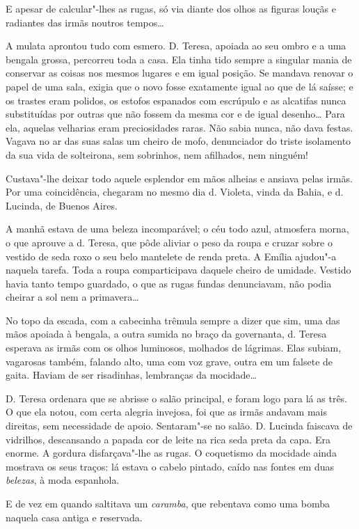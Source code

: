 E apesar de calcular"-lhes as rugas, só via diante dos olhos as figuras
louçãs e radiantes das irmãs noutros tempos\ldots{}

A mulata aprontou tudo com esmero. D. Teresa, apoiada ao seu ombro e a
uma bengala grossa, percorreu toda a casa. Ela tinha tido sempre a
singular mania de conservar as coisas nos mesmos lugares e em igual
posição. Se mandava renovar o papel de uma sala, exigia que o novo fosse
exatamente igual ao que de lá saísse; e os trastes eram polidos, os
estofos espanados com escrúpulo e as alcatifas nunca substituídas por
outras que não fossem da mesma cor e de igual desenho\ldots{} Para ela,
aquelas velharias eram preciosidades raras. Não sabia nunca, não dava
festas. Vagava no ar das suas salas um cheiro de mofo, denunciador do
triste isolamento da sua vida de solteirona, sem sobrinhos, nem
afilhados, nem ninguém!

Custava"-lhe deixar todo aquele esplendor em mãos alheias e ansiava pelas
irmãs. Por uma coincidência, chegaram no mesmo dia d. Violeta, vinda da
Bahia, e d. Lucinda, de Buenos Aires.

A manhã estava de uma beleza incomparável; o céu todo azul, atmosfera
morna, o que aprouve a d. Teresa, que pôde aliviar o peso da roupa e
cruzar sobre o vestido de seda roxo o seu belo mantelete de renda preta.
A Emília ajudou"-a naquela tarefa. Toda a roupa comparticipava daquele
cheiro de umidade. Vestido havia tanto tempo guardado, o que as rugas
fundas denunciavam, não podia cheirar a sol nem a primavera\ldots{}

No topo da escada, com a cabecinha trêmula sempre a dizer que sim, uma
das mãos apoiada à bengala, a outra sumida no braço da governanta, d.
Teresa esperava as irmãs com os olhos luminosos, molhados de lágrimas.
Elas subiam, vagarosas também, falando alto, uma com voz grave, outra em
um falsete de gaita. Haviam de ser risadinhas, lembranças da mocidade\ldots{}

D. Teresa ordenara que se abrisse o salão principal, e foram logo para
lá as três. O que ela notou, com certa alegria invejosa, foi que as
irmãs andavam mais direitas, sem necessidade de apoio. Sentaram"-se no
salão. D. Lucinda faiscava de vidrilhos, descansando a papada cor de
leite na rica seda preta da capa. Era enorme. A gordura disfarçava"-lhe
as rugas. O coquetismo da mocidade ainda mostrava os seus traços: lá
estava o cabelo pintado, caído nas fontes em duas \emph{belezas}, à moda
espanhola.

E de vez em quando saltitava um \emph{caramba}, que rebentava como uma
bomba naquela casa antiga e reservada.

